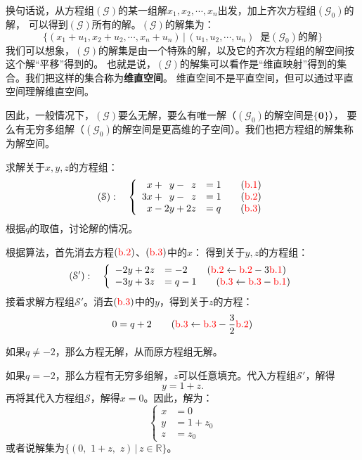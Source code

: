 \documentclass[12pt,UTF8]{ctexbook}
\begin{document}
换句话说，从方程组$(\mathcal{G})$的某一组解$x_1, x_2, \cdots , x_n$出发，加上齐次方程组$(\mathcal{G}_0)$的解，
可以得到$(\mathcal{G})$所有的解。$(\mathcal{G})$的解集为：
$$ \{(x_1+u_1, x_2+u_2, \cdots , x_n+u_n) \, | \, (u_1, u_2, \cdots, u_n) \;\; \mbox{是}(\mathcal{G}_0)\mbox{的解} \} $$
我们可以想象，$(\mathcal{G})$的解集是由一个特殊的解，以及它的齐次方程组的解空间按这个解“平移”得到的。
也就是说，$(\mathcal{G})$的解集可以看作是“维直映射”得到的集合。我们把这样的集合称为\textbf{维直空间}。
维直空间不是平直空间，但可以通过平直空间理解维直空间。

因此，一般情况下，$(\mathcal{G})$要么无解，要么有唯一解（$(\mathcal{G}_0)$的解空间是$\{\mathbf{0}\}$），
要么有无穷多组解（$(\mathcal{G}_0)$的解空间是更高维的子空间）。我们也把方程组的解集称为解空间。

\begin{et}
    求解关于$x,y,z$的方程组：
    $$ (\mathcal{S}):\quad \left\{
        \begin{array}{rl}
            \phantom{0}x + \phantom{0}y - \phantom{0}z &= 1 \quad \quad ({\color{red}\mathrm{b}.1})\\
            3x + \phantom{0}y - \phantom{0}z &= 1  \quad \quad ({\color{red}\mathrm{b}.2}) \\
            \phantom{0}x - 2y  + 2z &= q  \quad \quad ({\color{red}\mathrm{b}.3}) \\
    \end{array}
    \right. $$
    根据$q$的取值，讨论解的情况。
    
\end{et}

\begin{so}
    根据算法，首先消去方程$({\color{red}\mathrm{b}.2})$、$({\color{red}\mathrm{b}.3})$中的$x$：
    得到关于$y,z$的方程组：
    $$ (\mathcal{S'}):\quad \left\{
        \begin{array}{rl}
            -2y + 2z &= -2  \quad \quad ({{\color{red}\mathrm{b}.2} \leftarrow {\color{red}\mathrm{b}.2} - 3\color{red}\mathrm{b}.1}) \\
            -3y  + 3z &= q - 1  \quad \quad ({{\color{red}\mathrm{b}.3} \leftarrow {\color{red}\mathrm{b}.3} - \color{red}\mathrm{b}.1})
    \end{array}
    \right. $$
    接着求解方程组$\mathcal{S'}$。消去$({\color{red}\mathrm{b}.3})$中的$y$，得到关于$z$的方程：
    $$ 0 = q + 2 \quad \quad ({{\color{red}\mathrm{b}.3} \leftarrow {\color{red}\mathrm{b}.3} - \frac{3}{2}\color{red}\mathrm{b}.2})$$
    
    如果$q \neq -2$，那么方程无解，从而原方程组无解。

    如果$q = -2$，那么方程有无穷多组解，$z$可以任意填充。代入方程组$\mathcal{S'}$，解得
    $$ y = 1 + z.$$
    再将其代入方程组$\mathcal{S}$，解得$x = 0$。因此，解为：
    $$ \left\{
    \begin{array}{rl}
    x &= 0 \\
    y &= 1 + z_0\\
    z &= z_0
    \end{array}
    \right. $$
    或者说解集为$\{(0, \,\,1 + z,\,\, z) \, | \, z\in \mathbb{R}\}$。

\end{so}
\end{document}
